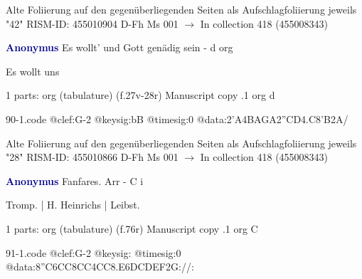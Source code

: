 \documentclass[twocolumn]{book}
\begin{document}
\newline Alte Foliierung auf den gegenüberliegenden Seiten als Aufschlagfoliierung jeweils "42"
\newline RISM-ID: 455010904
\newline D-Fh  Ms 001
\newline $\rightarrow$ In collection 418 (455008343)
      
\newline \par \vspace{7pt} \textcolor{darkblue}{\textbf{Anonymus  }}
\newline Es wollt' und Gott genädig sein - d
\newline org
\newline \begin{itshape}[f.27v, at left:] Es wollt uns\end{itshape} 
\newline \textcolor{darkblue}{}  1 parts: org (tabulature)  (f.27v-28r)
\newline Manuscript copy
.1  org  d  
\begin{filecontents*}{90-1.code}
@clef:G-2
@keysig:bB
@timesig:0
@data:2'A4BAGA2''CD4.C8'B2A/
\end{filecontents*}
\newline
%

\newline Alte Foliierung auf den gegenüberliegenden Seiten als Aufschlagfoliierung jeweils "28"
\newline RISM-ID: 455010866
\newline D-Fh  Ms 001
\newline $\rightarrow$ In collection 418 (455008343)
      
\newline \par \vspace{7pt} \textcolor{darkblue}{\textbf{Anonymus  }}
\newline Fanfares. Arr - C
\newline i
\newline \begin{itshape}[f.76r, at left:] Tromp. | H. Heinrichs | Leibst.\end{itshape} 
\newline \textcolor{darkblue}{}  1 parts: org (tabulature)  (f.76r)
\newline Manuscript copy
.1  org  C  
\begin{filecontents*}{91-1.code}
@clef:G-2
@keysig:
@timesig:0
@data:{8''C6CC8CC}4CC{8.E6D}{CDEF}2G://:
\end{filecontents*}
\newline
%
\end{document}
